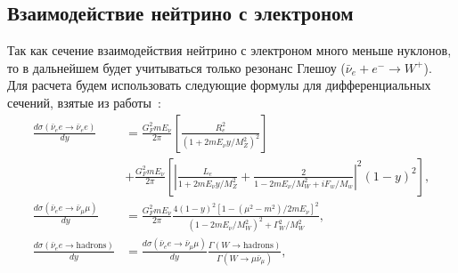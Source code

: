 \subsection{Взаимодействие нейтрино с электроном}
Так как сечение взаимодействия нейтрино с электроном много меньше нуклонов, то в дальнейшем будет учитываться только резонанс Глешоу ($\bar{\nu}_e+e^{-}\to W^{+}$). Для расчета будем использовать следующие формулы для дифференциальных сечений, взятые из работы~\cite{GANDHI199681}:
\begin{equation}
    \begin{aligned}
\frac{d\sigma(\bar{\nu}_e e \rightarrow \bar{\nu}_e e)}{dy} 
&= \frac{G_F^2 m E_\nu}{2\pi} \left[ \frac{R_e^2}{\left( 1 + 2m E_\nu y / M_Z^2 \right)^2}\right]\\ 
&+ \frac{G_F^2 m E_\nu}{2\pi}\left[\left| \frac{L_e}{1 + 2m E_\nu y / M_Z^2} + \frac{2}{1 - 2m E_\nu / M_W^2 + i F_w / M_w} \right|^2 (1 - y)^2 \right],\\
\frac{d\sigma(\bar{\nu}_e e \rightarrow \bar{\nu}_\mu \mu)}{dy} 
&= \frac{G_F^2 m E_\nu}{2\pi} \frac{4(1-y)^2 [1-(\mu^2-m^2)/2mE_\nu]^2}{(1-2mE_\nu/M_W^2)^2 + \Gamma_W^2/M_W^2}, \\
\frac{d\sigma(\bar{\nu}_e e \rightarrow \text{hadrons})}{dy} 
&= \frac{d\sigma(\bar{\nu}_e e \rightarrow \bar{\nu}_\mu \mu)}{dy} \frac{\Gamma(W \rightarrow \text{hadrons})}{\Gamma(W \rightarrow \mu \bar{\nu}_\mu)},
\end{aligned}
\end{equation}
